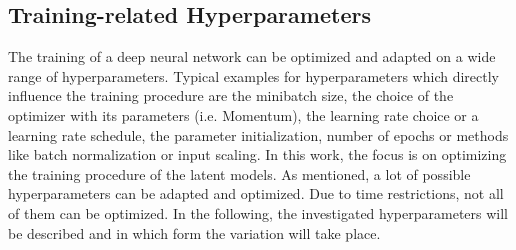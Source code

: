 \documentclass[12pt,DIV14,BCOR12mm,a4paper,footexclude,headinclude,halfparskip-,twoside,openright,openany,cleardoubleempty,idxtotoc,bibtotoc]{scrreprt} %
\numberwithin{equation}{chapter}
\begin{document}
\subsection{Training-related Hyperparameters}\label{subsec:Training-related Hyperparameters}
The training of a deep neural network can be optimized and adapted on a wide range of hyperparameters. Typical examples for hyperparameters which directly influence the training procedure are the minibatch size, the choice of the optimizer with its parameters (i.e. Momentum), the learning rate choice or a learning rate schedule, the parameter initialization, number of epochs or methods like batch normalization or input scaling. In this work, the focus is on optimizing the training procedure of the latent models. As mentioned, a lot of possible hyperparameters can be adapted and optimized. Due to time restrictions, not all of them can be optimized. In the following, the investigated hyperparameters will be described and in which form the variation will take place.
\end{document}
